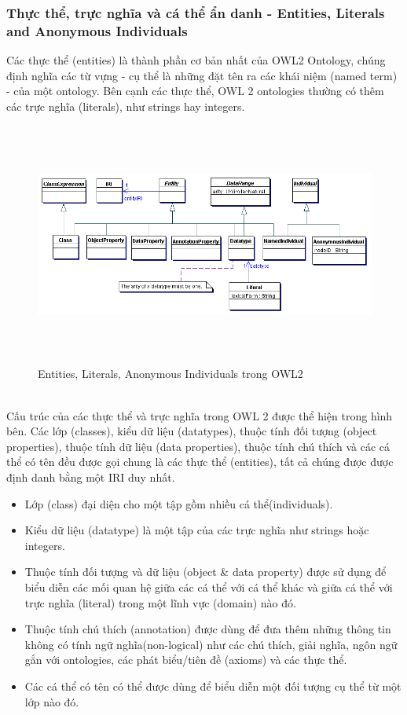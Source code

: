 \subsubsection{Thực thể, trực nghĩa và cá thể ẩn danh - Entities, Literals and Anonymous Individuals}
Các thực thể (entities) là thành phần cơ bản nhất của OWL2 Ontology, chúng định nghĩa các từ vựng - cụ thể là những đặt tên ra các khái niệm (named term) - của một ontology. Bên cạnh các thực thể, OWL 2 ontologies thường có thêm các trực nghĩa (literals), như strings hay integers.
\begin{figure}[ht!]
	\centering
	\includegraphics[width=150mm, height=80mm]{Figures/entities.png}
	\caption{Entities, Literals, Anonymous Individuals trong OWL2 \label{overflow}}
\end{figure}
\\
Cấu trúc của các thực thể và trực nghĩa trong OWL 2 được thể hiện trong hình bên. Các lớp (classes), kiểu dữ liệu (datatypes), thuộc tính đối tượng (object properties), thuộc tính dữ liệu (data properties), thuộc tính chú thích và các cá thể có tên đều được gọi chung là các thực thể (entities), tất cả chúng được được định danh bằng một IRI duy nhất. 
\begin{itemize}
	\item Lớp (class) đại diện cho một tập gồm nhiều cá thể(individuals).
	\item Kiểu dữ liệu (datatype) là một tập của các trực nghĩa như strings hoặc integers.
	\item Thuộc tính đối tượng và dữ liệu (object \& data property) được sử dụng để biểu diễn các mối quan hệ giữa các cá thể với cá thể khác và giữa cá thể với trực nghĩa (literal) trong một lĩnh vực (domain) nào đó.
	\item Thuộc tính chú thích (annotation) được dùng để đưa thêm những thông tin không có tính ngữ nghĩa(non-logical) như các chú thích, giải nghĩa, ngôn ngữ gắn với ontologies, các phát biểu/tiên đề (axioms) và các thực thể.
	\item  Các cá thể có tên có thể được dùng để biểu diễn một đối tượng cụ thể từ một lớp nào đó.
\end{itemize}
